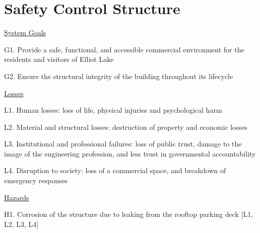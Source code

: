\documentclass[12pt]{article}
\begin{document}






\section{Safety Control Structure}



\underline{System Goals}

G1. Provide a safe, functional, and accessible commercial environment for the residents and visitors of Elliot Lake

G2. Ensure the structural integrity of the building throughout its lifecycle

\underline{Losses}

L1. Human losses: loss of life, physical injuries and psychological harm

L2. Material and structural losses: destruction of property and economic losses

L3. Institutional and professional failures: loss of public trust, damage to the image of the engineering profession, and less trust in governmental accountability

L4. Disruption to society: loss of a commercial space, and breakdown of emergency responses

\underline{Hazards}

H1. Corrosion of the structure due to leaking from the rooftop parking deck [L1, L2, L3, L4]
\end{document}
